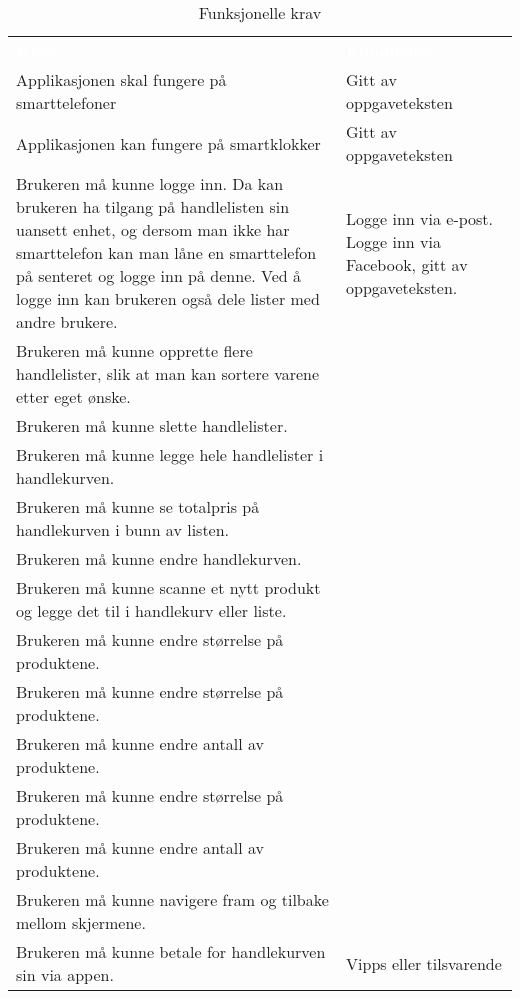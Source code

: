 \begin{table}[H]
    \caption{Funksjonelle krav}
    \label{tab:funksjonelle}
    \centering
    \begin{tabular}{L{25em} L{18em}}
        \textbf{\textcolor{white}{Krav}} & \textbf{\textcolor{white}{Kommentar}}\\
        Applikasjonen skal fungere på smarttelefoner & Gitt av oppgaveteksten\\
        Applikasjonen kan fungere på smartklokker & Gitt av oppgaveteksten
        \\
        Brukeren må kunne logge inn. Da kan brukeren ha tilgang på handlelisten sin uansett enhet, og dersom man ikke har smarttelefon kan man låne en smarttelefon på senteret og logge inn på denne. Ved å logge inn kan brukeren også dele lister med andre brukere. & Logge inn via e-post. Logge inn via Facebook, gitt av oppgaveteksten. \\ 
        Brukeren må kunne opprette flere handlelister, slik at man kan sortere varene etter eget ønske. &\\
        Brukeren må kunne slette handlelister. &\\
        Brukeren må kunne legge hele handlelister i handlekurven. &\\
        Brukeren må kunne se totalpris på handlekurven i bunn av listen. &\\
        Brukeren må kunne endre handlekurven. &\\
        Brukeren må kunne scanne et nytt produkt og legge det til i handlekurv eller liste. &\\
        Brukeren må kunne endre størrelse på produktene. &\\
        Brukeren må kunne endre størrelse på produktene. &\\
        Brukeren må kunne endre antall av produktene. &\\
        Brukeren må kunne endre størrelse på produktene. &\\
        Brukeren må kunne endre antall av produktene. &\\
        Brukeren må kunne navigere fram og tilbake mellom skjermene. &\\
        Brukeren må kunne betale for handlekurven sin via appen. & Vipps eller tilsvarende\\

\end{tabular}
\end{table}
